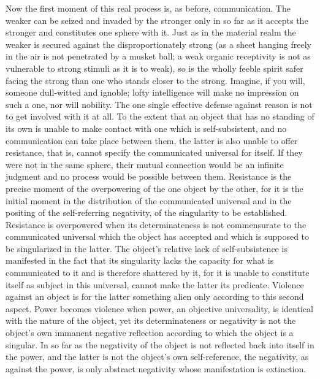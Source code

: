 Now the first moment of this real process is,
as before, communication.
The weaker can be seized and invaded
by the stronger only in so far as
it accepts the stronger and constitutes one sphere with it.
Just as in the material realm the weaker is
secured against the disproportionately strong
(as a sheet hanging freely in the air is
not penetrated by a musket ball;
a weak organic receptivity is not
as vulnerable to strong stimuli as it is to weak),
so is the wholly feeble spirit safer facing the strong
than one who stands closer to the strong.
Imagine, if you will, someone dull-witted and ignoble;
lofty intelligence will make no impression on such a one,
nor will nobility.
The one single effective defense against reason is
not to get involved with it at all.
To the extent that an object that has no standing of its own is
unable to make contact with one which is self-subsistent,
and no communication can take place between them,
the latter is also unable to offer resistance, that is,
cannot specify the communicated universal for itself.
If they were not in the same sphere,
their mutual connection would be an infinite judgment
and no process would be possible between them.
Resistance is the precise moment of
the overpowering of the one object by the other,
for it is the initial moment in
the distribution of the communicated universal
and in the positing of the self-referring negativity,
of the singularity to be established.
Resistance is overpowered when its determinateness is
not commensurate to the communicated universal
which the object has accepted
and which is supposed to be singularized in the latter.
The object's relative lack of self-subsistence is
manifested in the fact that its singularity lacks the capacity
for what is communicated to it
and is therefore shattered by it,
for it is unable to constitute itself
as subject in this universal,
cannot make the latter its predicate.
Violence against an object is
for the latter something alien
only according to this second aspect.
Power becomes violence when power, an objective universality,
is identical with the nature of the object,
yet its determinateness or negativity is
not the object's own immanent negative reflection
according to which the object is a singular.
In so far as the negativity of the object is not
reflected back into itself in the power,
and the latter is not the object's own self-reference,
the negativity, as against the power,
is only abstract negativity
whose manifestation is extinction.

